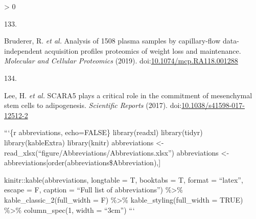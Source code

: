 \documentclass[11pt,twoside]{bristolthesis}
\newlength{\cslhangindent}
\newlength{\csllabelwidth}
\newenvironment{CSLReferences}[2] %
 {%
  \setlength{\parindent}{0pt}
  \ifodd #1 \everypar{\setlength{\hangindent}{\cslhangindent}}\ignorespaces\fi
  \ifnum #2 > 0
  \setlength{\parskip}{#2\baselineskip}
  \fi
 }%
 {}
\newcommand{\CSLLeftMargin}[1]{\parbox[t]{\csllabelwidth}{#1}}
\newcommand{\CSLRightInline}[1]{\parbox[t]{\linewidth - \csllabelwidth}{#1}\break}
\begin{document}
\begin{CSLReferences}{0}{0}
\leavevmode\hypertarget{ref-Bruderer2019}{}%
\CSLLeftMargin{133. }
\CSLRightInline{Bruderer, R. \emph{et al.} {Analysis of 1508 plasma samples by capillary-flow data-independent acquisition profiles proteomics of weight loss and maintenance}. \emph{Molecular and Cellular Proteomics} (2019). doi:\href{https://doi.org/10.1074/mcp.RA118.001288}{10.1074/mcp.RA118.001288}}

\leavevmode\hypertarget{ref-Lee2017a}{}%
\CSLLeftMargin{134. }
\CSLRightInline{Lee, H. \emph{et al.} {SCARA5 plays a critical role in the commitment of mesenchymal stem cells to adipogenesis}. \emph{Scientific Reports} (2017). doi:\href{https://doi.org/10.1038/s41598-017-12512-2}{10.1038/s41598-017-12512-2}}

\end{CSLReferences}
  \begin{abbreviations}
    ```\{r abbreviations, echo=FALSE\}
    library(readxl)
    library(tidyr)
    library(kableExtra)
    library(knitr)
    abbreviations \textless- read\_xlsx(``figure/Abbreviations/Abbreviations.xlsx'')
    abbreviations \textless- abbreviations{[}order(abbreviations\$Abbreviation),{]}

    kinitr::kable(abbreviations, longtable = T, booktabs = T, format = ``latex'', escape = F,
    caption = ``Full list of abbreviations'') \%\textgreater\%
    kable\_classic\_2(full\_width = F) \%\textgreater\%
    kable\_styling(full\_width = TRUE) \%\textgreater\%
    column\_spec(1, width = ``3cm'')
    ```
  \end{abbreviations}
\end{document}
